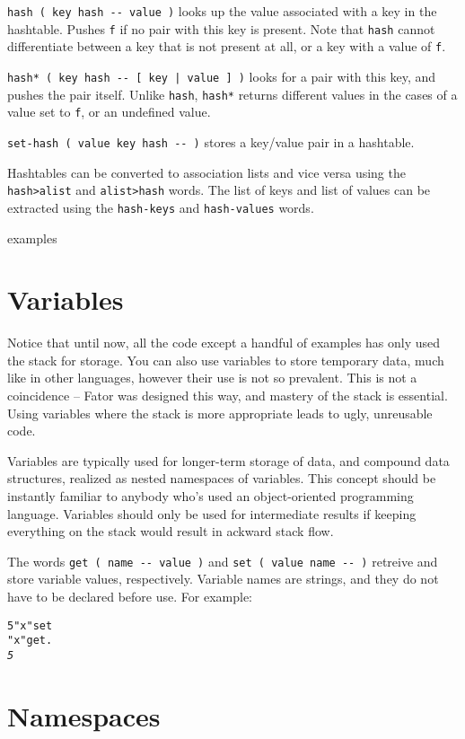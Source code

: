 \documentclass[english]{book}
\begin{document}
\texttt{hash ( key hash -{}- value )} looks up the value associated with a key in the hashtable. Pushes \texttt{f} if no pair with this key is present. Note that \texttt{hash} cannot differentiate between a key that is not present at all, or a key with a value of \texttt{f}.

\texttt{hash* ( key hash -{}- {[} key | value {]} )} looks for
a pair with this key, and pushes the pair itself. Unlike \texttt{hash},
\texttt{hash{*}} returns different values in the cases of a value
set to \texttt{f}, or an undefined value.

\texttt{set-hash ( value key hash -{}- )} stores a key/value pair in a hashtable.

Hashtables can be converted to association lists and vice versa using
the \texttt{hash>alist} and \texttt{alist>hash} words. The list of keys and
list of values can be extracted using the \texttt{hash-keys} and \texttt{hash-values} words.

examples

\section{Variables}

Notice that until now, all the code except a handful of examples has only used the stack for storage. You can also use variables to store temporary data, much like in other languages, however their use is not so prevalent. This is not a coincidence -- Fator was designed this way, and mastery of the stack is essential. Using variables where the stack is more appropriate leads to ugly, unreusable code.

Variables are typically used for longer-term storage of data, and compound data structures, realized as nested namespaces of variables. This concept should be instantly familiar to anybody who's used an object-oriented programming language. Variables should only be used for intermediate results if keeping everything on the stack would result in ackward stack flow.

The words \texttt{get ( name -{}- value )} and \texttt{set ( value name -{}- )} retreive and store variable values, respectively. Variable names are strings, and they do not have to be declared before use. For example:

\begin{alltt}
5 "x" set
"x" get .
\emph{5}
\end{alltt}

\section{Namespaces}
\end{document}
